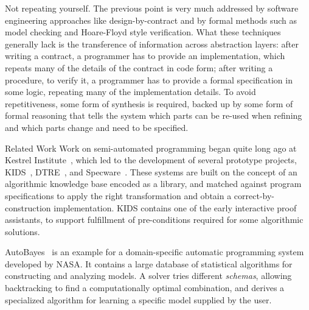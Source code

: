 \begin{paragraph}{Not repeating yourself.}
The previous point is very much addressed by software engineering approaches
like design-by-contract and by formal methods such as model checking and Hoare-Floyd
style verification.
What these techniques generally lack is the transference of information across
abstraction layers:
after writing a contract, a programmer has to provide an implementation,
which repeats many of the details of the contract in code form;
after writing a procedure, to verify it, a programmer has to provide a formal
specification in some logic, repeating many of the implementation details.
To avoid repetitiveness, some form of synthesis is required, backed up by some
form of formal reasoning that tells the system which parts can be re-used when
refining and which parts change and need to be specified.
\end{paragraph}

\begin{paragraph}{Related Work}
Work on semi-automated programming began quite long ago at Kestrel Institute~\cite{AI1985/Smith},
which led to the development of several prototype projects,
KIDS~\cite{TSE1990/Smith}, DTRE~\cite{CPS1991/Blaine}, 
and Specware~\cite{2001/McDonald:specware}.
These systems are built on the concept of an algorithmic knowledge base encoded
as a library, and matched against program specifications to apply the
right transformation and obtain a correct-by-construction implementation.
KIDS contains one of the early interactive proof assistants, to support
fulfillment of pre-conditions required for some algorithmic solutions.

AutoBayes~\cite{JFP2003/Fischer} is an example for a domain-specific automatic programming system
developed by NASA.
It contains a large database of statistical algorithms for constructing and
analyzing models.
A solver tries different \emph{schemas}, allowing backtracking to find
a computationally optimal combination, and derives a specialized algorithm
for learning a specific model supplied by the user.
\end{paragraph}
